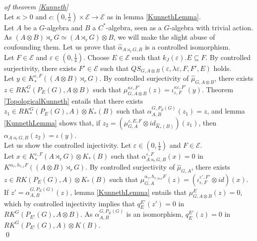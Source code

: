 \begin{dem} \textit{of theorem \ref{Kunneth}}\\
Let $\kappa>0$ and $c : (0,\frac{1}{\kappa})\times\mathcal E\rightarrow \mathcal E$ as in lemma \ref{KunnethLemma}.\\

Let $A$ be a $G$-algebra and $B$ a $C^*$-algebra, seen as a $G$-algebra with trivial action. As $(A\otimes B)\rtimes_r G \simeq (A\rtimes_r G)\otimes B$, we will make the slight abuse of coufounding them. Let us prove that $\hat \alpha_{A\rtimes_r G,B}$ is a controlled isomorphism.\\

Let $F\in\mathcal E$ and $\varepsilon\in (0,\frac{1}{4})$. Choose $E \in\mathcal E$ such that $k_J(\varepsilon).E\subseteq F$. By controlled surjectivity, there exists $F'\in \mathcal E$ such that $QS_{G,A\otimes B}(\varepsilon,\lambda\varepsilon, F,F',E)$ holds.\\

Let $y\in K^{\varepsilon,F}_*((A\otimes B)\rtimes_r G)$. By controlled surjectivity of $\hat\mu_{G,A\otimes B}$, there exists $z\in RK_*^G(P_E(G), A\otimes B) $ such that $\mu_{G,A\otimes B}^{\kappa\varepsilon,F'}(z)=\iota_{\varepsilon,F}^{\kappa\varepsilon,F'}(y)$. Theorem \ref{TopologicalKunneth} entails that there exists $z_1 \in RK_*^G(P_E(G),A)\otimes K_*(B) $ such that $\alpha_{A,B}^{G,P_E(G)}(z_1)=z$, and lemma \ref{KunnethLemma} shows that, if $z_2=(\mu_{G,A}^{\varepsilon,E,F} \otimes id_{\hat K_*(B)})(z_1)$, then $\alpha_{A\rtimes_r G,B}(z_2)=\iota_{}^{}(y)$.\\

Let us show the controlled injectivity. Let $\varepsilon\in(0,\frac{1}{4})$ and $F\in\mathcal E$.\\ 

Let $x\in K^{\varepsilon,F}_*(A\rtimes_r G)\otimes K_*(B)$ such that $\alpha_{A\rtimes_r G,B}^{\varepsilon,F}(x)=0$ in $K^{\alpha_\tau,h_{\tau,\varepsilon} F}((A\otimes B)\rtimes_r G)$. By controlled surjectivity of $\hat\mu_{G,A}$, there exists $z\in RK(P_E(G),A)\otimes K_*(B)$ such that $\mu_{G,A}^{\alpha_\tau,h_{\tau,\alpha_\tau\varepsilon} F}(z)=(\iota_{\varepsilon,F}^{\varepsilon',F'}\otimes id) (x)$. If $z' = \alpha_{A,B}^{G,P_E(G)}(z)$, lemma \ref{KunnethLemma} entails that $\mu^{E}_{G,A\otimes B}(z)=0$, which by controlled injectivity implies that $q_E^{E'}(z')=0$ in $RK^G(P_{E'}(G),A\otimes B)$. As $\alpha_{A,B}^{G,P_E(G)}$ is an isomorphism, $q_E^{E'}(z)=0$ in $RK^G(P_{E'}(G),A)\otimes K(B)$.\\
\qed
\end{dem}




























